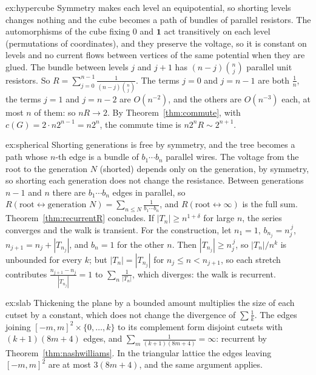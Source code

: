 \begin{solution}{ex:hypercube}
\idea Symmetry makes each level an equipotential, so shorting levels changes nothing and the cube becomes a path of bundles of parallel resistors.
\writeup The automorphisms of the cube fixing $0$ and $\mathbf 1$ act transitively on each level (permutations of coordinates), and they preserve the voltage, so it is constant on levels and no current flows between vertices
of the same potential when they are glued. The bundle between levels $j$ and $j+1$ has $(n-j)\binom nj$ parallel unit resistors. So $R=\sum_{j=0}^{n-1}\frac1{(n-j)\binom nj}$. The terms $j=0$ and $j=n-1$ are both $\frac1n$, the terms
$j=1$ and $j=n-2$ are $O(n^{-2})$, and the others are $O(n^{-3})$ each, at most $n$ of them: so $nR\to2$. By Theorem~\ref{thm:commute}, with $c(G)=2\cdot n2^{n-1}=n2^n$, the commute time is $n2^nR\sim2^{n+1}$.
\end{solution}

\begin{solution}{ex:spherical}
\idea Shorting generations is free by symmetry, and the tree becomes a path whose $n$-th edge is a bundle of $b_1\cdots b_n$ parallel wires.
\writeup The voltage from the root to the generation $N$ (shorted) depends only on the generation, by symmetry, so shorting each generation does not change the resistance. Between generations $n-1$ and $n$ there are
$b_1\cdots b_n$ edges in parallel, so $R(\text{root}\leftrightarrow\text{generation }N)=\sum_{n\le N}\frac1{b_1\cdots b_n}$, and $R(\text{root}\leftrightarrow\infty)$ is the full sum. Theorem~\ref{thm:recurrentR} concludes. If $|T_n|\ge n^{1+\delta}$ for large $n$, the series converges and the walk is transient. For the construction, let
$n_1=1$, $b_{n_j}=n_j^{\,j}$, $n_{j+1}=n_j+|T_{n_j}|$, and $b_n=1$ for the other $n$. Then $|T_{n_j}|\ge n_j^{\,j}$, so $|T_n|/n^k$ is unbounded for every $k$; but $|T_n|=|T_{n_j}|$ for $n_j\le n<n_{j+1}$, so each stretch contributes
$\frac{n_{j+1}-n_j}{|T_{n_j}|}=1$ to $\sum_n\frac1{|T_n|}$, which diverges: the walk is recurrent.
\end{solution}

\begin{solution}{ex:slab}
\idea Thickening the plane by a bounded amount multiplies the size of each cutset by a constant, which does not change the divergence of $\sum\frac1k$.
\writeup The edges joining $[-m,m]^2\times\{0,\dots,k\}$ to its complement form disjoint cutsets with $(k+1)(8m+4)$ edges, and $\sum_m\frac1{(k+1)(8m+4)}=\infty$: recurrent by Theorem~\ref{thm:nashwilliams}. In the triangular lattice the
edges leaving $[-m,m]^2$ are at most $3(8m+4)$, and the same argument applies.
\end{solution}

